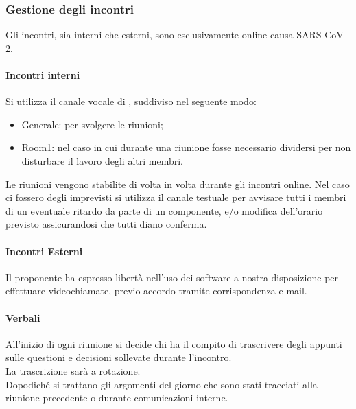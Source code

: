 		 \subsubsection{Gestione degli incontri}
		 Gli incontri, sia interni che esterni, sono esclusivamente online causa SARS-CoV-2.
		 \paragraph{Incontri interni}
		 Si utilizza il canale vocale di , suddiviso nel seguente modo:
		 
		 \begin{itemize}
		 	\item {\sffamily Generale}: per svolgere le riunioni;
		 	\item {\sffamily Room1}: nel caso in cui durante una riunione fosse necessario dividersi per non disturbare il lavoro degli altri membri.
	 	\end{itemize}
 		Le riunioni vengono stabilite di volta in volta durante gli incontri online. 
 		Nel caso ci fossero degli imprevisti si utilizza il canale testuale per avvisare tutti i membri di un eventuale ritardo da parte di un componente, e/o modifica dell'orario previsto assicurandosi che tutti diano conferma.
		 \paragraph{Incontri Esterni}
		 Il proponente ha espresso libertà nell'uso dei software a nostra disposizione per effettuare videochiamate, previo accordo tramite corrispondenza e-mail.
		 
		 \paragraph{Verbali}
		 All'inizio di ogni riunione si decide chi ha il compito di trascrivere degli appunti sulle questioni e decisioni sollevate durante l'incontro. \\
		 La trascrizione sarà a rotazione. \\
     
		 Dopodiché si trattano gli argomenti del giorno che sono stati tracciati alla riunione precedente o durante comunicazioni interne. 
		 
